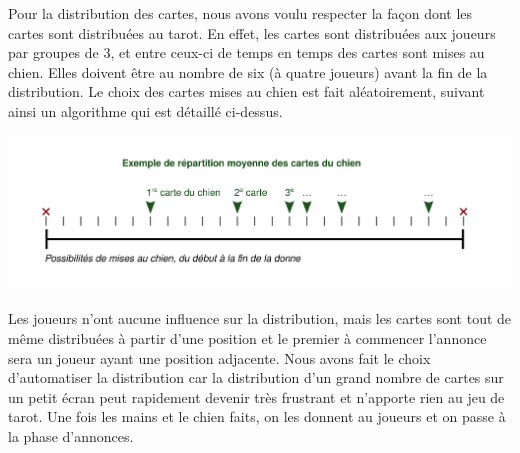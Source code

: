 \documentclass[a4paper]{report}
\begin{document}
				\newpage
				Pour la distribution des cartes, nous avons voulu respecter la façon dont les cartes sont distribuées au tarot. En effet, les cartes sont distribuées aux joueurs par 					groupes de 3, et entre ceux-ci de temps en temps des cartes sont mises au chien. Elles doivent être au nombre de six (à quatre joueurs) avant la fin de la distribution.
				Le choix des cartes mises au chien est fait aléatoirement, suivant ainsi un algorithme qui est détaillé ci-dessus.
				\begin{center}
					\includegraphics[scale=0.9]{Images/rep.png}
				\end{center}
				Les joueurs n’ont aucune influence sur la distribution, mais les cartes sont tout de même distribuées à partir d’une position et le premier à commencer l’annonce sera un 					joueur ayant une position adjacente.
				Nous avons fait le choix d’automatiser la distribution car la distribution d’un grand nombre de cartes sur un petit écran peut rapidement devenir très frustrant et 					n’apporte rien au jeu de tarot. Une fois les mains et le chien faits, on les donnent au joueurs et on passe à la phase d’annonces.
\end{document}
